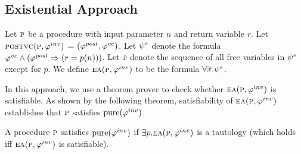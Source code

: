 \subsection{Existential Approach}

Let $\textsc{p}$ be a procedure with input parameter $n$ and return variable $r$.
Let\\ $\textsc{postvc}({\textsc{p}},{\varphi^{inv}})$ = $(\varphi^{post},\varphi^{vc})$.
Let $\psi^e$ denote the formula $\varphi^{vc} \wedge (\varphi^{post} \Rightarrow (r = p(n)))$.
Let $\overline{x}$ denote the sequence of all free variables in $\psi^e$ except for $p$.
We define $\textsc{ea}(\textsc{p},\varphi^{inv})$ to be the formula $ \forall \overline{x}. \psi^e$.

In this approach, we use a theorem prover to check whether $\textsc{ea}(\textsc{p},\varphi^{inv})$ is satisfiable.
As shown by the following theorem, satisfiability of $\textsc{ea}(\textsc{p},\varphi^{inv})$ establishes that $\textsc{p}$
satisfies $\mathrm{pure}(\varphi^{inv})$.

\begin{theorem}
\label{theorem:EA}
A procedure $\textsc{p}$ satisfies $\mathrm{pure}(\varphi^{inv})$ if
$\exists p. \textsc{ea}(\textsc{p},\varphi^{inv})$ is a tautology
(which holds iff $\textsc{ea}(\textsc{p},\varphi^{inv})$ is satisfiable).
\end{theorem}

